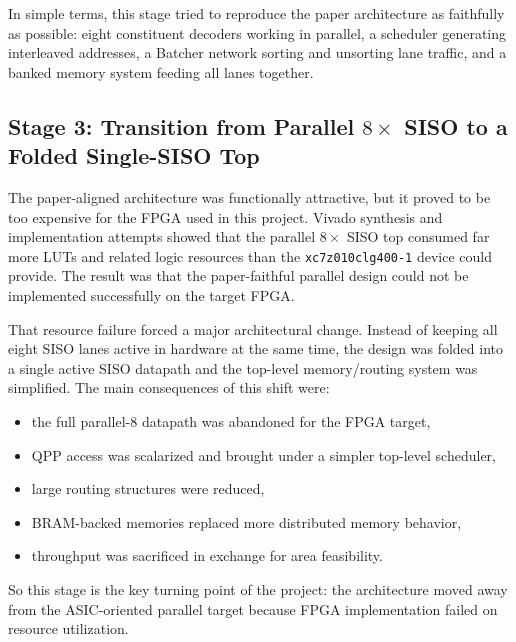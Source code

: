 \documentclass[conference]{IEEEtran}
\begin{document}
In simple terms, this stage tried to reproduce the paper architecture as faithfully as possible: eight constituent decoders working in parallel, a scheduler generating interleaved addresses, a Batcher network sorting and unsorting lane traffic, and a banked memory system feeding all lanes together.

\subsection{Stage 3: Transition from Parallel \(8\times\) SISO to a Folded Single-SISO Top}
The paper-aligned architecture was functionally attractive, but it proved to be too expensive for the FPGA used in this project. Vivado synthesis and implementation attempts showed that the parallel \(8\times\) SISO top consumed far more LUTs and related logic resources than the \texttt{xc7z010clg400-1} device could provide. The result was that the paper-faithful parallel design could not be implemented successfully on the target FPGA.

That resource failure forced a major architectural change. Instead of keeping all eight SISO lanes active in hardware at the same time, the design was folded into a single active SISO datapath and the top-level memory/routing system was simplified. The main consequences of this shift were:
\begin{itemize}
\item the full parallel-8 datapath was abandoned for the FPGA target,
\item QPP access was scalarized and brought under a simpler top-level scheduler,
\item large routing structures were reduced,
\item BRAM-backed memories replaced more distributed memory behavior,
\item throughput was sacrificed in exchange for area feasibility.
\end{itemize}

So this stage is the key turning point of the project: the architecture moved away from the ASIC-oriented parallel target because FPGA implementation failed on resource utilization.
\end{document}
